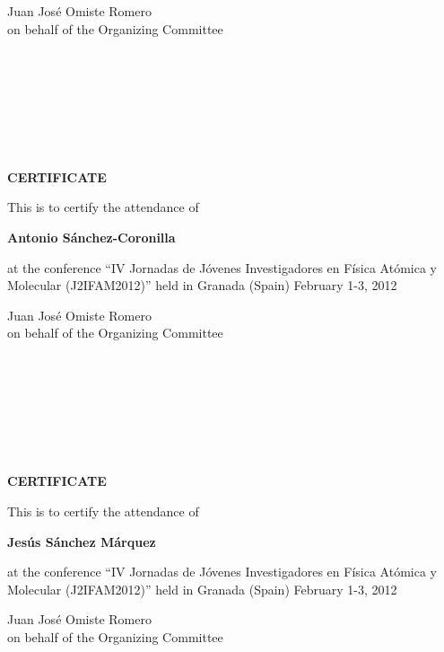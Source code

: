 \documentclass [13pt,a4paper] {letter}
\begin{document}
\vspace {4cm}
\begin{raggedleft}
Juan José Omiste Romero\\
on behalf of the Organizing Committee
\newpage
\end{raggedleft}
\begin{verbatim}







\end{verbatim}
\pagestyle{empty}
\begin{center}
{\bf {\Huge CERTIFICATE}}

\vspace {1.5cm}
This is to certify the attendance of
\vspace {1cm}

{\bf \Large  Antonio    Sánchez-Coronilla }
\vspace {1cm}

at the conference { \textquotedblleft IV Jornadas de Jóvenes Investigadores en Física Atómica y Molecular (J2IFAM2012)\textquotedblright} 
held in Granada (Spain) February 1-3, 2012
\end{center}
\vspace {4cm}
\begin{raggedleft}
Juan José Omiste Romero\\
on behalf of the Organizing Committee
\newpage
\end{raggedleft}
\begin{verbatim}







\end{verbatim}
\pagestyle{empty}
\begin{center}
{\bf {\Huge CERTIFICATE}}

\vspace {1.5cm}
This is to certify the attendance of
\vspace {1cm}

{\bf \Large  Jesús  Sánchez  Márquez }
\vspace {1cm}

at the conference { \textquotedblleft IV Jornadas de Jóvenes Investigadores en Física Atómica y Molecular (J2IFAM2012)\textquotedblright} 
held in Granada (Spain) February 1-3, 2012
\end{center}
\vspace {4cm}
\begin{raggedleft}
Juan José Omiste Romero\\
on behalf of the Organizing Committee
\newpage
\end{raggedleft}
\begin{verbatim}







\end{verbatim}
\end{document}
